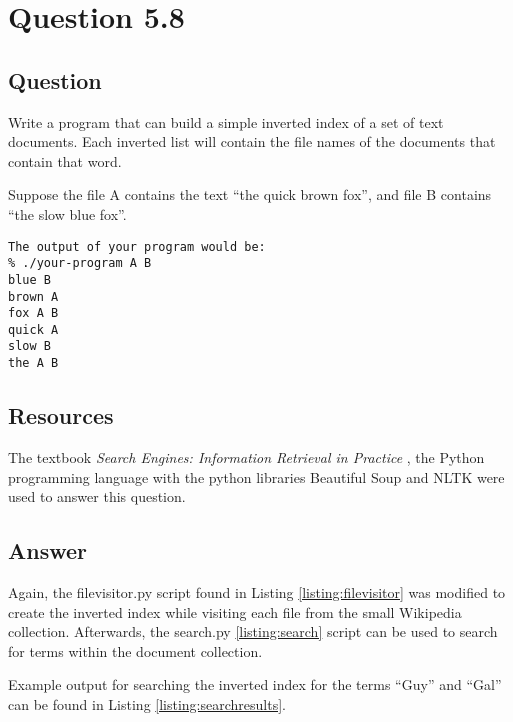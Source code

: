\section{Question 5.8}

\subsection{Question}
Write a program that can build a simple inverted index of a set of text documents. Each inverted list will contain the file names of the documents that contain that word.

Suppose the file A contains the text ``the quick brown fox'', and file B contains ``the slow blue fox''. 

\begin{verbatim}
The output of your program would be:
% ./your-program A B
blue B
brown A
fox A B
quick A
slow B
the A B
\end{verbatim}

\subsection{Resources}
The textbook \textit{Search Engines: Information Retrieval in Practice} \cite{seirip}, the Python programming language \cite{python} with the python libraries Beautiful Soup \cite{py:beautifulsoup} and NLTK \cite{py:nltk} were used to answer this question.

\subsection{Answer}
Again, the filevisitor.py script found in Listing \ref{listing:filevisitor} was modified to create the inverted index while visiting each file from the small Wikipedia collection.  Afterwards, the search.py \ref{listing:search} script can be used to search for terms within the document collection.

Example output for searching the inverted index for the terms ``Guy'' and ``Gal'' can be found in Listing \ref{listing:searchresults}.\\


